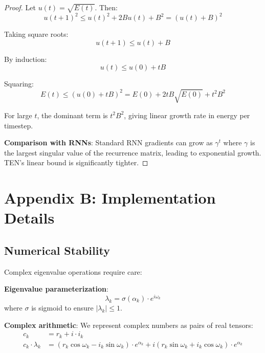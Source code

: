 \documentclass[11pt,letterpaper]{article}
\begin{document}
\begin{proof}
Let $u(t) = \sqrt{E(t)}$. Then:
\begin{equation}
    u(t+1)^2 \leq u(t)^2 + 2Bu(t) + B^2 = (u(t) + B)^2
\end{equation}

Taking square roots:
\begin{equation}
    u(t+1) \leq u(t) + B
\end{equation}

By induction:
\begin{equation}
    u(t) \leq u(0) + tB
\end{equation}

Squaring:
\begin{equation}
    E(t) \leq (u(0) + tB)^2 = E(0) + 2tB\sqrt{E(0)} + t^2B^2
\end{equation}

For large $t$, the dominant term is $t^2B^2$, giving linear growth rate in energy per timestep.

\textbf{Comparison with RNNs}: Standard RNN gradients can grow as $\gamma^t$ where $\gamma$ is the largest singular value of the recurrence matrix, leading to exponential growth. TEN's linear bound is significantly tighter.
\end{proof}

\section{Appendix B: Implementation Details}

\subsection{Numerical Stability}

Complex eigenvalue operations require care:

\textbf{Eigenvalue parameterization}:
\begin{equation}
    \lambda_k = \sigma(\alpha_k) \cdot e^{i\omega_k}
\end{equation}
where $\sigma$ is sigmoid to ensure $|\lambda_k| \leq 1$.

\textbf{Complex arithmetic}: We represent complex numbers as pairs of real tensors:
\begin{align}
    c_k &= r_k + i \cdot i_k \\
    c_k \cdot \lambda_k &= (r_k \cos\omega_k - i_k \sin\omega_k) \cdot e^{\alpha_k} + i(r_k \sin\omega_k + i_k \cos\omega_k) \cdot e^{\alpha_k}
\end{align}
\end{document}
